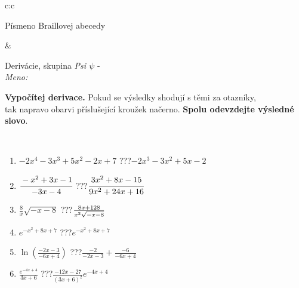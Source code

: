 \documentclass[10pt]{report}
\begin{document}
\begin{tabular}{c:c}
\begin{minipage}[c][104.5mm][t]{0.5\linewidth}
\begin{center}
\begin{minipage}{0.20\linewidth}
\begin{center}
{\small Písmeno Braillovej abecedy}
\end{center}
\end{minipage}
\end{center}
\end{minipage}
&
\begin{minipage}[c][104.5mm][t]{0.5\linewidth}
\begin{center}
\vspace{7mm}
{\huge Derivácie, skupina \textit{Psi $\psi$} -}\\[5mm]
\textit{Meno:}\phantom{xxxxxxxxxxxxxxxxxxxxxxxxxxxxxxxxxxxxxxxxxxxxxxxxxxxxxxxxxxxxxxxxx}\\[5mm]
\begin{minipage}{0.95\linewidth}
\begin{center}
\textbf{Vypočítej derivace.} Pokud se výsledky shodují s těmi za otazníky,\\tak napravo obarvi příslušející kroužek načerno. \textbf{Spolu odevzdejte výsledné slovo}.
\end{center}
\end{minipage}
\\[1mm]
\begin{minipage}{0.79\linewidth}
\begin{center}
\begin{varwidth}{\linewidth}
\begin{enumerate}
\normalsize
\item $-2x^4-3x^3+5x^2-2x+7$\quad \dotfill\; ???\;\dotfill \quad $-2x^3-3x^2+5x-2$
\item $\cfrac{-x^2+3x-1}{-3x-4}$\quad \dotfill\; ???\;\dotfill \quad $\cfrac{3x^2+8x-15}{9x^2+24x+16}$
\item $\frac{8}{x}\sqrt{-x-8}$\quad \dotfill\; ???\;\dotfill \quad $\frac{8x+128}{x^2 \sqrt{\smash[b]{-x-8}}}$
\item $e^{-x^2+8x+7}$\quad \dotfill\; ???\;\dotfill \quad $e^{-x^2+8x+7}$
\item $\ln{\left(\frac{-2x-3}{-6x+4}\right)}$\quad \dotfill\; ???\;\dotfill \quad $\frac{-2}{-2x-3}+\frac{-6}{-6x+4}$
\item $\frac{e^{-4x+4}}{3x+6}$\quad \dotfill\; ???\;\dotfill \quad $\frac{-12x-27}{(3x+6)^2}e^{-4x+4}$
\end{enumerate}
\end{varwidth}
\end{center}
\end{minipage}
\begin{minipage}{0.20\linewidth}
\begin{center}

\end{center}
\end{minipage}
\end{center}
\end{minipage}
\end{tabular}
\end{document}
